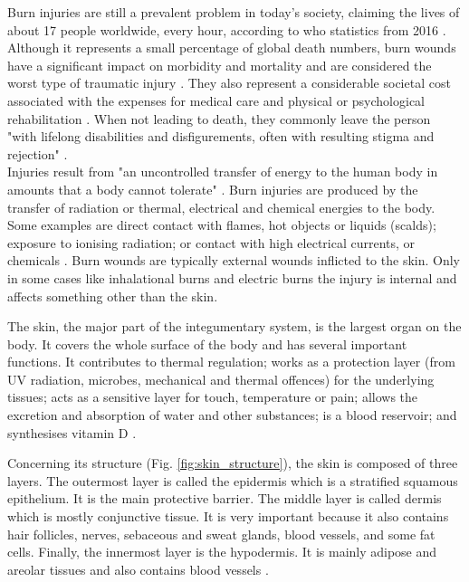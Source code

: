 Burn injuries are still a prevalent problem in today's society, claiming the lives of about 17 people worldwide, every hour, according to \gls{who} statistics from 2016 \cite{GHE2016_xls}. Although it represents a small percentage of global death numbers, burn wounds have a significant impact on morbidity and mortality and are considered the worst type of traumatic injury \cite{isbi_guidelines_burn_care}. They also represent a considerable societal cost associated with the expenses for medical care and physical or psychological rehabilitation \cite{Brusselaers_2010_europe_systematic_review}. When not leading to death, they commonly leave the person "with lifelong disabilities and disfigurements, often with resulting stigma and rejection" \cite{who2011_sucess_stories}.\\

Injuries result from "an uncontrolled transfer of energy to the human body in amounts that a body cannot tolerate" \cite{who2011_sucess_stories}. Burn injuries are produced by the transfer of radiation or thermal, electrical and chemical energies to the body. Some examples are direct contact with flames, hot objects or liquids (scalds); exposure to ionising radiation; or contact with high electrical currents, or chemicals \cite{who_unicef2008_burns_chapter}. Burn wounds are typically external wounds inflicted to the skin. Only in some cases like inhalational burns and electric burns the injury is internal and affects something other than the skin.

The skin, the major part of the integumentary system, is the largest organ on the body. It covers the whole surface of the body and has several important functions. It contributes to thermal regulation; works as a protection layer (from UV radiation, microbes, mechanical and thermal offences) for the underlying tissues; acts as a sensitive layer for touch, temperature or pain; allows the excretion and absorption of water and other substances; is a blood reservoir; and synthesises vitamin D \cite{Tortora2009_principles_anatomy_physiology}. 

Concerning its structure (Fig. \ref{fig:skin_structure}), the skin is composed of three layers. The outermost layer is called the epidermis which is a stratified squamous epithelium. It is the main protective barrier. The middle layer is called dermis which is mostly conjunctive tissue.  It is very important because it also contains hair follicles, nerves, sebaceous and sweat glands, blood vessels, and some fat cells. Finally, the innermost layer is the hypodermis. It is mainly adipose and areolar tissues and also contains blood vessels \cite{Tortora2009_principles_anatomy_physiology}.\\


